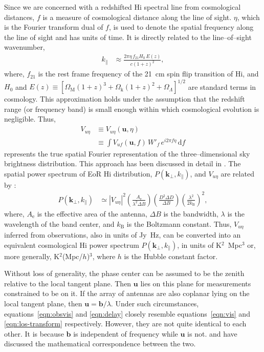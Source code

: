 \documentclass[preprint2,iop,numberedappendix]{emulateapj}
\newcommand{\dif}{\mathrm{d}}
\begin{document}
Since we are concerned with a redshifted H{\sc i} spectral line from cosmological distances, $f$ is a measure of cosmological distance along the line of sight. $\eta$, which is the Fourier transform dual of $f$, is used to denote the spatial frequency along the line of sight and has units of time. It is directly related to the line--of--sight wavenumber, 
\begin{align}\label{eqn:k-prll}
  k_\parallel &\approx \frac{2\pi\eta\,f_{21}H_0\,E(z)}{c(1+z)^2}, 
\end{align}
where, $f_{21}$ is the rest frame frequency of the 21~cm spin flip transition of H{\sc i}, and $H_0$ and $E(z)\equiv [\Omega_\textrm{M}(1+z)^3+\Omega_\textrm{k}(1+z)^2+\Omega_\Lambda]^{1/2}$ are standard terms in cosmology. This approximation holds under the assumption that the redshift range (or frequency band) is small enough within which cosmological evolution is negligible. Thus,
\begin{align}\label{eqn:los-transform}
  V_{u\eta} &\equiv V_{u\eta}(\boldsymbol{u},\eta) \nonumber\\
  &\equiv \int V_{uf}(\boldsymbol{u},f)\,W'_f\,e^{i2\pi f\eta}\,\dif f
\end{align}
represents the true spatial Fourier representation of the three--dimensional sky brightness distribution. This approach has been discussed in detail in \citet{mor04}. The spatial power spectrum of EoR H{\sc i} distribution, $P(\boldsymbol{k}_\perp,k_\parallel)$, and $V_{u\eta}$ are related by \citep{mor04,mcq06,par12a}: 
\begin{align}\label{eqn:true-power_spectrum}
  P(\boldsymbol{k}_\perp,k_\parallel) &\simeq |V_{u\eta}|^2\left(\frac{A_\textrm{e}}{\lambda^2\Delta B}\right)\left(\frac{D^2\Delta D}{\Delta B}\right)\left(\frac{\lambda^2}{2k_\textrm{B}}\right)^2,
\end{align}
where, $A_\textrm{e}$ is the effective area of the antenna, $\Delta B$ is the bandwidth, $\lambda$ is the wavelength of the band center, and $k_\textrm{B}$ is the Boltzmann constant. Thus, $V_{u\eta}$ inferred from observations, also in units of Jy~Hz, can be converted into an equivalent cosmological H{\sc i} power spectrum $P(\boldsymbol{k}_\perp,k_\parallel)$, in units of K$^2$~Mpc$^3$ or, more generally, K$^2$(Mpc/$h$)$^3$, where $h$ is the Hubble constant factor.

Without loss of generality, the phase center can be assumed to be the zenith relative to the local tangent plane. Then $\boldsymbol{u}$ lies on this plane for measurements constrained to be on it. If the array of antennas are also coplanar lying on the local tangent plane, then $\boldsymbol{u}=\boldsymbol{b}/\lambda$. Under such circumstances, equations~\ref{eqn:obsvis} and \ref{eqn:delay} closely resemble equations~\ref{eqn:vis} and \ref{eqn:los-transform} respectively. However, they are not quite identical to each other. It is because $\boldsymbol{b}$ is independent of frequency while $\boldsymbol{u}$ is not. \citet{par12b} and \citet{liu14a} have discussed the mathematical correspondence between the two. 
\end{document}
